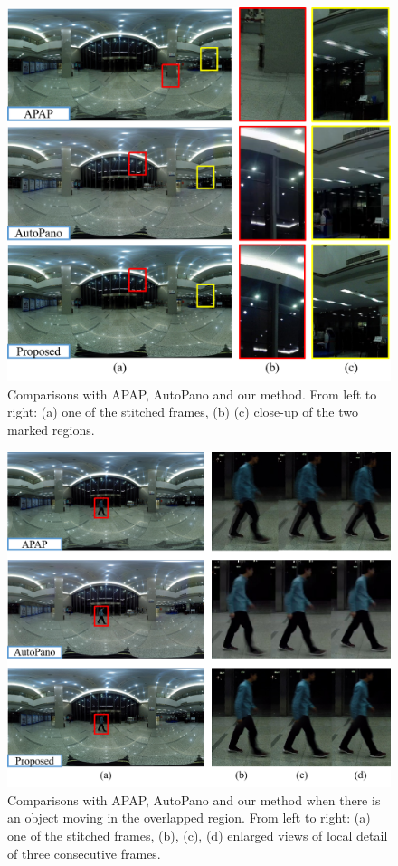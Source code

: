 \documentclass[conference]{IEEEtran}
\begin{document}
\begin{figure}[t]
\centering
\includegraphics[scale=0.415]{picture35.png}
\caption{Comparisons with APAP, AutoPano and our method. From left to right: (a) one of the stitched frames, (b) (c) close-up of the two marked regions.}
\label{fig:pic17}
\end{figure}
\begin{figure}[t]
\centering
\includegraphics[scale=0.36]{picture36.png}
\caption{Comparisons with APAP, AutoPano and our method when there is an object moving in the overlapped region. From left to right: (a) one of the stitched frames, 
(b), (c), (d) enlarged views of local detail of three consecutive frames.}
\label{fig:pic15}
\end{figure}
\end{document}
